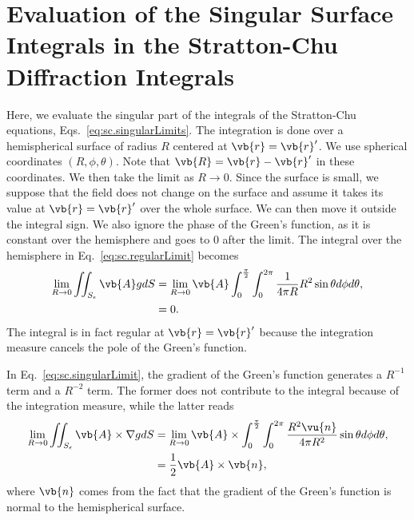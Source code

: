 \documentclass[11pt,SymmetricalJury]{inrsthesis/inrsthesis}
\begin{document}
\appendix
{}
\renewcommand{\thechapter}{\Alph{chapter}}
\renewcommand{\thesection}{\Alph{chapter}.\arabic{section}}
\chapter{Evaluation of the Singular Surface Integrals in the Stratton-Chu Diffraction Integrals}
\label{app.limits}


Here, we evaluate the singular part of the integrals of the Stratton-Chu equations,
Eqs.~\eqref{eq:sc.singularLimits}.
The integration is done over a hemispherical surface of radius $R$ centered at
$\vb{r}=\vb{r}'$. We use spherical coordinates $(R,\phi,\theta)$. Note that
$\vb{R}=\vb{r}-\vb{r}'$ in these coordinates.
We then take the limit as $R\rightarrow0$. Since the surface
is small, we suppose that the field does not change on the surface and assume
it takes its value at $\vb{r}=\vb{r}'$ over the whole surface. We can then move it
outside the integral sign. We also ignore the phase of the Green's function, as
it is constant over the hemisphere and goes to 0 after the limit.
The integral over the hemisphere in Eq.~\eqref{eq:sc.regularLimit} becomes
  \begin{align}
    \lim_{R\rightarrow0}\iint_{S_\epsilon}\vb{A}gdS
      &= \lim_{R\rightarrow0}\vb{A}\int_0^{\frac{\pi}{2}}\int_0^{2\pi}\frac{1}{4\pi R} R^2 \sin\theta d\phi d\theta,\nonumber\\
      &= 0.
  \end{align}
The integral is in fact regular at $\vb{r}=\vb{r}'$ because the integration measure
cancels the pole of the Green's function.

In Eq.~\eqref{eq:sc.singularLimit}, the gradient of the Green's function
generates a $R^{-1}$ term and a $R^{-2}$ term. The former does not contribute to the integral
because of the integration measure, while the latter reads
  \begin{align}
    \lim_{R\rightarrow0}\iint_{S_\epsilon}\vb{A}\times\nabla gdS
      &= \lim_{R\rightarrow0}\vb{A}\times
      \int_0^{\frac{\pi}{2}}\int_0^{2\pi}\frac{R^2\vu{n}}{4\pi R^2}\sin\theta d\phi d\theta, \nonumber\\
      &= \frac{1}{2}\vb{A}\times\vb{n},
  \end{align}
where $\vb{n}$ comes from the fact that the gradient of the Green's function is
normal to the hemispherical surface.
\end{document}
